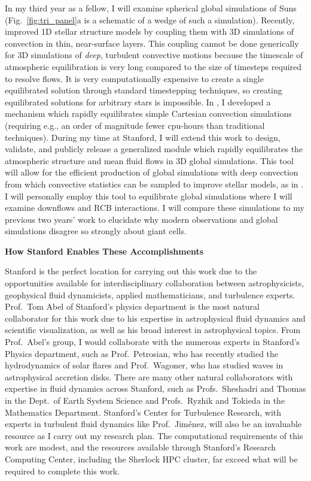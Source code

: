 \documentclass[onecolumn, 11pt, hmargin=1in, vmargin=1in]{aastex62}
\begin{document}
In my third year as a fellow, I will examine spherical global simulations of Suns (Fig.~\ref{fig:tri_panel}a is a schematic of a wedge of such a simulation).
Recently, \citet{jorgensen&weiss2019} improved 1D stellar structure models by coupling them with 3D simulations of convection in thin, near-surface layers.
This coupling cannot be done generically for 3D simulations of \emph{deep}, turbulent convective motions because the timescale of atmospheric equilibration is very long compared to the size of timesteps required to resolve flows.
It is very computationally expensive to create a single equilibrated solution through standard timestepping techniques, so creating equilibrated solutions for arbitrary stars is impossible.
In \citet{anders&all2018}, I developed a mechanism which rapidly equilibrates simple Cartesian convection simulations (requiring e.g., an order of magnitude fewer cpu-hours than traditional techniques).
During my time at Stanford, I will extend this work to design, validate, and publicly release a generalized module which rapidly equilibrates the atmospheric structure and mean fluid flows in 3D global simulations.
This tool will allow for the efficient production of global simulations with deep convection from which convective statistics can be sampled to improve stellar models, as in \citet{jorgensen&weiss2019}.
I will personally employ this tool to equilibrate global simulations where I will examine downflows and RCB interactions.
I will compare these simulations to my previous two years' work to elucidate why modern observations and global simulations disagree so strongly about giant cells.


\begin{center}
\vspace{-5pt}
\textbf{How Stanford Enables These Accomplishments}
\vspace{-8pt}
\end{center}
Stanford is the perfect location for carrying out this work due to the opportunities available for interdisciplinary collaboration between astrophysicists, geophysical fluid dynamicists, applied mathematicians, and turbulence experts.
Prof.~Tom Abel of Stanford's physics department is the most natural collaborator for this work due to his expertise in astrophysical fluid dynamics and scientific visualization, as well as his broad interest in astrophysical topics.
From Prof.~Abel's group, I would collaborate with the numerous experts in Stanford's Physics department, such as Prof.~Petrosian, who has recently studied the hydrodynamics of solar flares and Prof.~Wagoner, who has studied waves in astrophysical accretion disks.
There are many other natural collaborators with expertise in fluid dynamics across Stanford, such as Profs.~Sheshadri and Thomas in the Dept.~of Earth System Science and Profs.~Ryzhik and Tokieda in the Mathematics Department.
Stanford's Center for Turbulence Research, with experts in turbulent fluid dynamics like Prof.~Jim\'{e}nez, will also be an invaluable resource as I carry out my research plan.
The computational requirements of this work are modest, and the resources available through Stanford's Research Computing Center, including the Sherlock HPC cluster, far exceed what will be required to complete this work.
\end{document}
